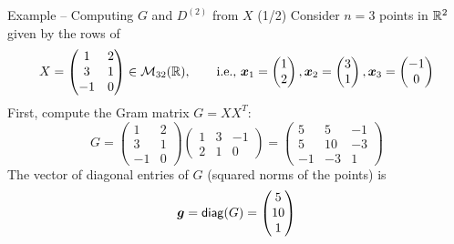 \documentclass[aspectratio=169]{beamer}\usepackage[]{graphicx}\usepackage[]{xcolor}
\begin{document}
\begin{frame}{Example -- Computing $G$ and $D^{(2)}$ from $X$ (1/2)}
Consider $n=3$ points in $\mathbb{R}^2$ given by the rows of
\[
X = \begin{pmatrix}
1 & 2 \\
3 & 1 \\
-1 & 0
\end{pmatrix} \in \mathcal{M}_{32}(\mathbb{R}), \qquad\text{i.e., }
\bm{x}_1 = \begin{pmatrix} 1 \\ 2 \end{pmatrix},
\bm{x}_2 = \begin{pmatrix} 3 \\ 1 \end{pmatrix},
\bm{x}_3 = \begin{pmatrix} -1 \\ 0 \end{pmatrix}
\]
\vfill
First, compute the Gram matrix $G = XX^T$:
\[
G = \begin{pmatrix}
1 & 2 \\
3 & 1 \\
-1 & 0
\end{pmatrix}
\begin{pmatrix}
1 & 3 & -1 \\
2 & 1 & 0
\end{pmatrix}
= \begin{pmatrix}
5 & 5 & -1 \\
5 & 10 & -3 \\
-1 & -3 & 1
\end{pmatrix}
\]
\vfill
The vector of diagonal entries of $G$ (squared norms of the points) is
\[
\bm{g} = \mathsf{diag}(G) = \begin{pmatrix} 5 \\ 10 \\ 1 \end{pmatrix}
\]
\end{frame}
\end{document}
